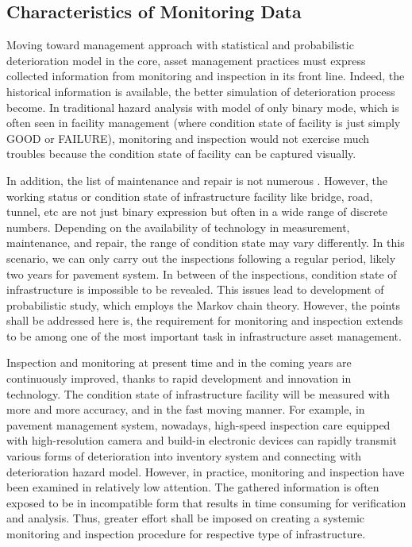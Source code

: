 \subsection{Characteristics of Monitoring Data}
\label{224}
Moving toward management approach with statistical and probabilistic deterioration model in the core, asset management practices must express collected information from monitoring and inspection in its front line. Indeed, the historical information is available, the better simulation of deterioration process become. In traditional hazard analysis with model of only binary mode, which is often seen in facility management (where condition state of facility is just simply GOOD or FAILURE), monitoring and inspection would not exercise much troubles because the condition state of facility can be captured visually.

In addition, the list of maintenance and repair is not numerous \cite{aoki2}. However, the working status or condition state of infrastructure facility like bridge, road, tunnel, etc are not just binary expression but often in a wide range of discrete numbers. Depending on the availability of technology in measurement, maintenance, and repair, the range of condition state may vary differently. In this scenario, we can only carry out the inspections following a regular period, likely two years for pavement system. In between of the inspections, condition state of infrastructure is impossible to be revealed. This issues lead to development of probabilistic study, which employs the Markov chain theory. However, the points shall be addressed here is, the requirement for monitoring and inspection extends to be among one of the most important task in infrastructure asset management.

Inspection and monitoring at present time and in the coming years are continuously improved, thanks to rapid development and innovation in technology. The condition state of infrastructure facility will be measured with more and more accuracy, and in the fast moving manner. For example, in pavement management system, nowadays, high-speed inspection care equipped with high-resolution camera and build-in electronic devices can rapidly transmit various forms of deterioration into inventory system and connecting with deterioration hazard model. However, in practice, monitoring and inspection have been examined in relatively low attention. The gathered information is often exposed to be in incompatible form that results in time consuming for verification and analysis. Thus, greater effort shall be imposed on creating a systemic monitoring and inspection procedure for respective type of infrastructure.

